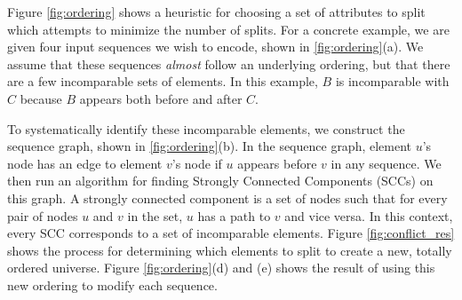  Figure \ref{fig:ordering} shows a heuristic for choosing a set of attributes to split which attempts to minimize the number of splits. For a concrete example, we are given four input sequences we wish to encode, shown in \ref{fig:ordering}(a). We assume that these sequences \textit{almost} follow an underlying ordering, but that there are a few incomparable sets of elements. In this example, $B$ is incomparable with $C$ because $B$ appears both before and after $C$. 

To systematically identify these incomparable elements, we construct the sequence graph, shown in \ref{fig:ordering}(b). In the sequence graph, element $u$'s node has an edge to element $v$'s node if $u$ appears before $v$ in any sequence. We then run an algorithm for finding Strongly Connected Components (SCCs) on this graph. A strongly connected component is a set of nodes such that for every pair of nodes $u$ and $v$ in the set, $u$ has a path to $v$ and vice versa. In this context, every SCC corresponds to a set of incomparable elements. Figure \ref{fig:conflict_res} shows the process for determining which elements to split to create a new, totally ordered universe. Figure \ref{fig:ordering}(d) and (e) shows the result of using this new ordering to modify each sequence. 


